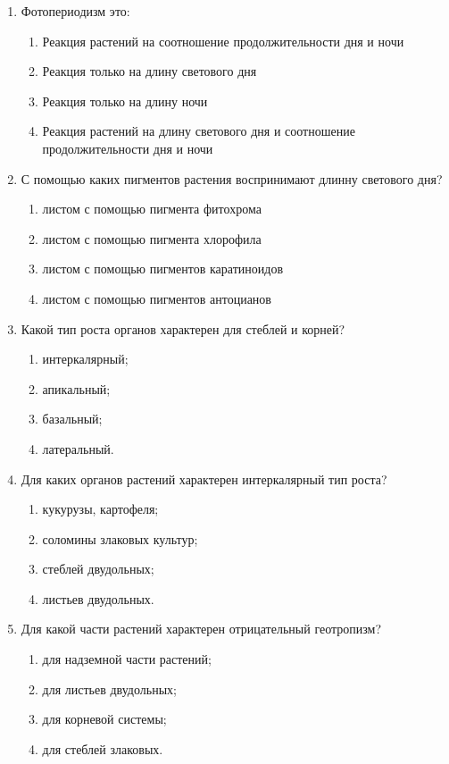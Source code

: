 \begin{enumerate}
\item Фотопериодизм это:
\begin{enumerate}
	\item Реакция растений на соотношение продолжительности дня и ночи
	\item Реакция только на длину светового дня
	\item Реакция только на длину ночи
	\item Реакция растений на длину светового дня и соотношение продолжительности дня и ночи
\end{enumerate}

\item С помощью каких пигментов растения воспринимают длинну светового дня?
\begin{enumerate}
	\item листом с помощью пигмента фитохрома   
	\item листом с помощью пигмента хлорофила
	\item листом с помощью пигментов каратиноидов   
	\item листом с помощью пигментов антоцианов
\end{enumerate}

\item Какой тип роста органов характерен для стеблей и корней?
\begin{enumerate}
	\item интеркалярный;  
	\item апикальный; 
	\item базальный;  
	\item латеральный.
\end{enumerate}

\item Для каких органов растений характерен интеркалярный тип роста?
\begin{enumerate}
	\item кукурузы, картофеля; 
	\item соломины злаковых культур; 
	\item стеблей двудольных; 
	\item листьев двудольных.
\end{enumerate}

\item Для какой части растений характерен отрицательный геотропизм?\
\begin{enumerate}
	\item для надземной части растений; 
	\item для листьев двудольных; 
	\item для корневой системы; 
	\item для стеблей злаковых.
\end{enumerate}


\end{enumerate}
